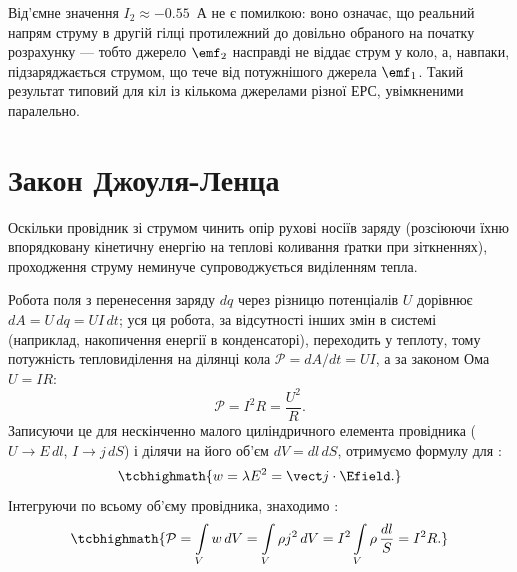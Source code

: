 \begin{Attention}
	Від'ємне значення $I_2\approx -0.55$~А не є помилкою: воно означає, що реальний напрям струму в другій гілці протилежний до довільно обраного на
	початку розрахунку --- тобто джерело $\emf_2$ насправді не віддає струм у коло, а, навпаки, підзаряджається струмом, що тече від
	потужнішого джерела $\emf_1$. Такий результат типовий для кіл із кількома джерелами різної ЕРС, увімкненими паралельно.
\end{Attention}

\section{Закон Джоуля-Ленца}\hypertarget{joule-lenz-law}{}

Оскільки провідник зі струмом чинить опір рухові носіїв заряду (розсіюючи їхню впорядковану кінетичну енергію на теплові коливання ґратки при
зіткненнях), проходження струму неминуче супроводжується виділенням тепла.

Робота
поля з перенесення заряду $dq$ через різницю потенціалів $U$ дорівнює $dA = U\, dq = UI\, dt$; уся ця робота, за відсутності інших змін в системі
(наприклад, накопичення енергії в конденсаторі), переходить у теплоту, тому потужність тепловиділення на ділянці кола $\mathcal P = dA/dt = UI$, а
за законом Ома $U=IR$:
\begin{equation*}
	\mathcal P = I^2 R = \frac{U^2}{R}.
\end{equation*}
Записуючи це для нескінченно малого циліндричного елемента провідника ($U \to E\, dl$, $I \to j\, dS$) і ділячи на його об'єм $dV = dl\, dS$,
отримуємо формулу для :
\begin{equation}\label{eq:JouleLenzDiff}
	\tcbhighmath{
		w = \lambda E^2 = \vect j\cdot\Efield.
	}
\end{equation}
Інтегруючи по всьому об'єму провідника, знаходимо :
\begin{equation}\label{eq:JouleLenzIntegral}
	\tcbhighmath{
		\mathcal P = \int\limits_V w\, dV = \int\limits_V \rho j^2\, dV = I^2\int\limits_V \rho\,\frac{dl}{S} = I^2 R.
	}
\end{equation}

